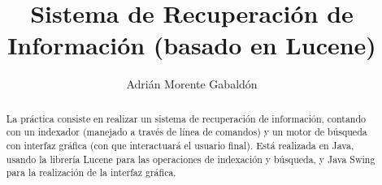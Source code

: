 \documentclass[]{article}
\title{Sistema de Recuperación de Información (basado en Lucene)}
\author{Adrián Morente Gabaldón}
\begin{document}
\maketitle

\begin{abstract}
La práctica consiste en realizar un sistema de recuperación de información, contando con un indexador (manejado a través de línea de comandos) y un motor de búsqueda con interfaz gráfica (con que interactuará el usuario final). Está realizada en Java, usando la librería Lucene para las operaciones de indexación y búsqueda, y Java Swing para la realización de la interfaz gráfica.
\end{abstract}

\section{}
\end{document}
